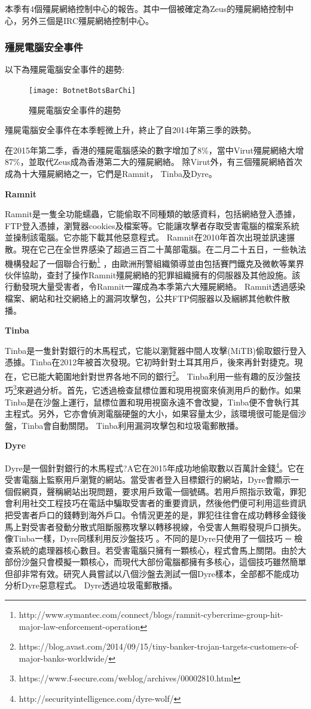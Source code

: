 \documentclass[14pt]{extarticle}
\begin{document}
本季有4個殭屍網絡控制中心的報告。其中一個被確定為Zeus的殭屍網絡控制中心，另外三個是IRC殭屍網絡控制中心。

\subsubsection*{殭屍電腦安全事件}

以下為殭屍電腦安全事件的趨勢:
\begin{figure}[h!]
\centerline{\texttt{[image: BotnetBotsBarChi]}}
\caption{殭屍電腦安全事件的趨勢}
\end{figure}
\FloatBarrier
殭屍電腦安全事件在本季輕微上升，終止了自2014年第三季的跌勢。

在2015年第二季，香港的殭屍電腦感染的數字增加了8\%，當中Virut殭屍網絡大增87\%，並取代Zeus成為香港第二大的殭屍網絡。
除Virut外，有三個殭屍網絡首次成為十大殭屍網絡之一，它們是Ramnit， Tinba及Dyre。

\textbf{Ramnit} 

Ramnit是一隻全功能蠕蟲，它能偷取不同種類的敏感資料，包括網絡登入憑據，FTP登入憑據，瀏覽器cookies及檔案等。它能讓攻擊者存取受害電腦的檔案系統並操制該電腦。它亦能下載其他惡意程式。
Ramnit在2010年首次出現並訊速搌散。現在它己在全世界感染了超過三百二十萬部電腦。在二月二十五日，一些執法機構發起了一個聯合行動\footnote{http://www.symantec.com/connect/blogs/ramnit-cybercrime-group-hit-major-law-enforcement-operation} ，由歐洲刑警組織領導並由包括賽門鐵克及微軟等業界伙伴協助，查封了操作Ramnit殭屍網絡的犯罪組織擁有的伺服器及其他設施。該行動發現大量受害者，令Ramnit一躍成為本季第六大殭屍網絡。
Ramnit透過感染檔案、網站和社交網絡上的漏洞攻擊包，公共FTP伺服器以及綑綁其他軟件散播。

\textbf{Tinba} 

Tinba是一隻針對銀行的木馬程式，它能以瀏覽器中間人攻擊(MiTB)偷取銀行登入憑據。Tinba在2012年被首次發現。它初時針對土耳其用戶，後來再針對捷克。現在，它已能大範圍地針對世界各地不同的銀行\footnote{https://blog.avast.com/2014/09/15/tiny-banker-trojan-targets-customers-of-major-banks-worldwide/}。
Tinba利用一些有趣的反沙盤技巧\footnote{https://www.f-secure.com/weblog/archives/00002810.html}來避過分析。首先，它透過檢查鼠標位置和現用視窗來偵測用戶的動作。如果Tinba是在沙盤上運行，鼠標位置和現用視窗永遠不會改變，Tinba便不會執行其主程式。另外，它亦會偵測電腦硬盤的大小，如果容量太少，該環境很可能是個沙盤，Tinba會自動關閉。
Tinba利用漏洞攻擊包和垃圾電郵散播。


\textbf{Dyre} 

Dyre是一個針對銀行的木馬程式?A它在2015年成功地偷取數以百萬計金錢\footnote{http://securityintelligence.com/dyre-wolf/ }。它在受害電腦上監察用戶瀏覽的網站。當受害者登入目標銀行的網站，Dyre會顯示一個假網頁，聲稱網站出現問題，要求用戶致電一個號碼。若用戶照指示致電，罪犯會利用社交工程技巧在電話中騙取受害者的重要資訊，然後他們便可利用這些資訊把受害者戶口的錢轉到海外戶口。令情況更差的是，罪犯往往會在成功轉移金錢後馬上對受害者發動分散式阻斷服務攻擊以轉移視線，令受害人無暇發現戶口損失。
像Tinba一樣，Dyre同樣利用反沙盤技巧 。不同的是Dyre只使用了一個技巧 ─ 檢查系統的處理器核心數目。若受害電腦只擁有一顆核心，程式會馬上關閉。由於大部份沙盤只會模擬一顆核心，而現代大部份電腦都擁有多核心，這個技巧雖然簡單但卻非常有效。研究人員嘗試以八個沙盤去測試一個Dyre樣本，全部都不能成功分析Dyre惡意程式。
Dyre透過垃圾電郵散播。
 
\end{document}
